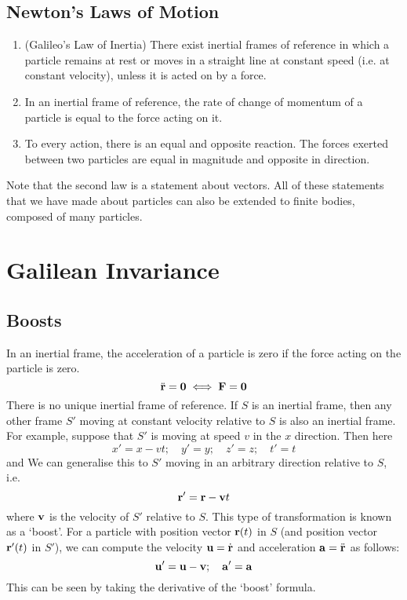 \documentclass{article}
\begin{document}
\subsection{Newton's Laws of Motion}
\begin{enumerate}
	\item (Galileo's Law of Inertia) There exist inertial frames of reference in which a particle remains at rest or moves in a straight line at constant speed (i.e. at constant velocity), unless it is acted on by a force.
	\item In an inertial frame of reference, the rate of change of momentum of a particle is equal to the force acting on it.
	\item To every action, there is an equal and opposite reaction. The forces exerted between two particles are equal in magnitude and opposite in direction.
\end{enumerate}
Note that the second law is a statement about vectors. All of these statements that we have made about particles can also be extended to finite bodies, composed of many particles.

\section{Galilean Invariance}
\subsection{Boosts}
In an inertial frame, the acceleration of a particle is zero if the force acting on the particle is zero.
\[ \ddot{\vb r} = \vb 0 \iff \vb F = \vb 0 \]
There is no unique inertial frame of reference. If $S$ is an inertial frame, then any other frame $S'$ moving at constant velocity relative to $S$ is also an inertial frame. For example, suppose that $S'$ is moving at speed $v$ in the $x$ direction. Then here
\[ x'=x-vt;\quad y'=y;\quad z'=z;\quad t'=t \]
and
We can generalise this to $S'$ moving in an arbitrary direction relative to $S$, i.e.
\[ \vb r' = \vb r - \vb v t \]
where $\vb v$ is the velocity of $S'$ relative to $S$. This type of transformation is known as a `boost'. For a particle with position vector $\vb r(t)$ in $S$ (and position vector $\vb r'(t)$ in $S'$), we can compute the velocity $\vb u = \dot{\vb r}$ and acceleration $\vb a = \ddot{\vb r}$ as follows:
\[ \vb u' = \vb u - \vb v;\quad \vb a' = \vb a \]
This can be seen by taking the derivative of the `boost' formula.
\end{document}
